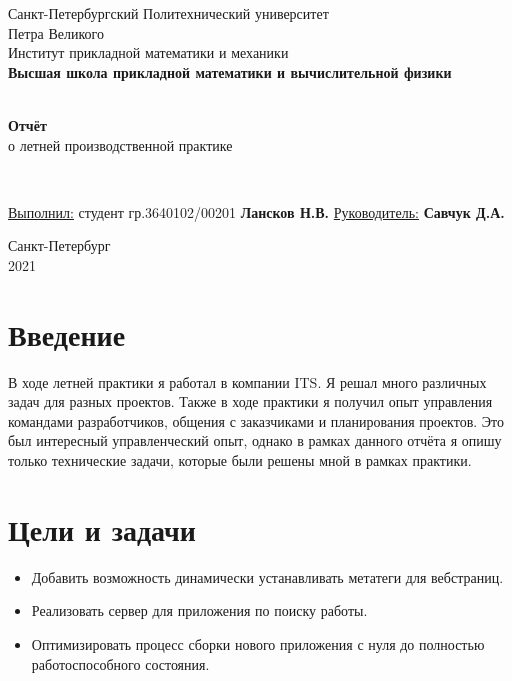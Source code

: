 \documentclass[a4papaer,12pt]{article}
\begin{document}
\begin{titlepage}
	\center
		Санкт-Петербургский Политехнический
		университет \\ Петра Великого\\
		Институт прикладной математики и механики
		\\ \textbf{Высшая школа прикладной математики и вычислительной физики}

	\vfill ~
	\textbf{
		\\ \large Отчёт
	}
    \\ о летней производственной практике 

	\vfill ~

    \begin{flushleft}
    \underline{Выполнил:}  \hspace{\fill} студент гр.3640102/00201 \textbf{Лансков Н.В.} \linebreak[2]
	\underline{Руководитель:} \hspace{\fill} \textbf{Савчук Д.А.} \\
    \end{flushleft}

\vfill

{\large}	Санкт-Петербург
\\ 2021
\end{titlepage}

\tableofcontents
\newpage

\section{Введение}
В ходе летней практики я работал в компании ITS\cite{its}. Я решал много различных задач для разных проектов. Также 
в ходе практики я получил опыт управления командами разработчиков, общения с заказчиками и планирования проектов.
Это был интересный управленческий опыт, однако в рамках данного отчёта я опишу только технические задачи, 
которые были решены мной в рамках практики.

\section{Цели и задачи}

\begin{itemize}
    \item Добавить возможность динамически устанавливать метатеги для вебстраниц.
    \item Реализовать сервер для приложения по поиску работы.
    \item Оптимизировать процесс сборки нового приложения с нуля до полностью работоспособного состояния.
\end{itemize}
\end{document}
